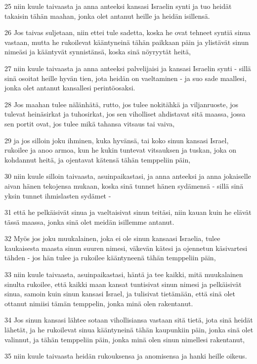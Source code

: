 \par 25 niin kuule taivaasta ja anna anteeksi kansasi Israelin synti ja tuo heidät takaisin tähän maahan, jonka olet antanut heille ja heidän isillensä.
\par 26 Jos taivas suljetaan, niin ettei tule sadetta, koska he ovat tehneet syntiä sinua vastaan, mutta he rukoilevat kääntyneinä tähän paikkaan päin ja ylistävät sinun nimeäsi ja kääntyvät synnistänsä, koska sinä nöyryytät heitä,
\par 27 niin kuule taivaasta ja anna anteeksi palvelijaisi ja kansasi Israelin synti - sillä sinä osoitat heille hyvän tien, jota heidän on vaeltaminen - ja suo sade maallesi, jonka olet antanut kansallesi perintöosaksi.
\par 28 Jos maahan tulee nälänhätä, rutto, jos tulee nokitähkä ja viljanruoste, jos tulevat heinäsirkat ja tuhosirkat, jos sen viholliset ahdistavat sitä maassa, jossa sen portit ovat, jos tulee mikä tahansa vitsaus tai vaiva,
\par 29 ja jos silloin joku ihminen, kuka hyvänsä, tai koko sinun kansasi Israel, rukoilee ja anoo armoa, kun he kukin tuntevat vitsauksen ja tuskan, joka on kohdannut heitä, ja ojentavat kätensä tähän temppeliin päin,
\par 30 niin kuule silloin taivaasta, asuinpaikastasi, ja anna anteeksi ja anna jokaiselle aivan hänen tekojensa mukaan, koska sinä tunnet hänen sydämensä - sillä sinä yksin tunnet ihmislasten sydämet -
\par 31 että he pelkäisivät sinua ja vaeltaisivat sinun teitäsi, niin kauan kuin he elävät tässä maassa, jonka sinä olet meidän isillemme antanut.
\par 32 Myös jos joku muukalainen, joka ei ole sinun kansaasi Israelia, tulee kaukaisesta maasta sinun suuren nimesi, väkevän kätesi ja ojennetun käsivartesi tähden - jos hän tulee ja rukoilee kääntyneenä tähän temppeliin päin,
\par 33 niin kuule taivaasta, asuinpaikastasi, häntä ja tee kaikki, mitä muukalainen sinulta rukoilee, että kaikki maan kansat tuntisivat sinun nimesi ja pelkäisivät sinua, samoin kuin sinun kansasi Israel, ja tulisivat tietämään, että sinä olet ottanut nimiisi tämän temppelin, jonka minä olen rakentanut.
\par 34 Jos sinun kansasi lähtee sotaan vihollisiansa vastaan sitä tietä, jota sinä heidät lähetät, ja he rukoilevat sinua kääntyneinä tähän kaupunkiin päin, jonka sinä olet valinnut, ja tähän temppeliin päin, jonka minä olen sinun nimellesi rakentanut,
\par 35 niin kuule taivaasta heidän rukouksensa ja anomisensa ja hanki heille oikeus.

